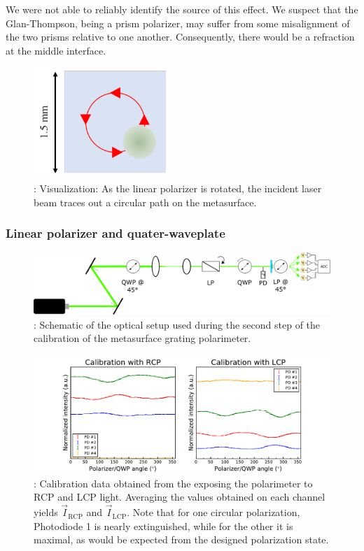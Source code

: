 \documentclass[footinbib,aps,prl,superscriptaddress]{revtex4-1}
\begin{document}
We were not able to reliably identify the source of this effect. We suspect that the Glan-Thompson, being a prism polarizer, may suffer from some misalignment of the two prisms relative to one another. Consequently, there would be a refraction at the middle interface.

\begin{figure}[!htp]
	\centering
	\includegraphics[width=5cm]{orbit.pdf}
	\caption{\label{fig:orbit}: Visualization: As the linear polarizer is rotated, the incident laser beam traces out a circular path on the metasurface.}
\end{figure} 

\subsubsection{Linear polarizer and quater-waveplate}

\begin{figure}[!htp]
	\centering
	\includegraphics[width=\linewidth]{schematic_II.pdf}
	\caption{\label{fig:schematic_II}: Schematic of the optical setup used during the second step of the calibration of the metasurface grating polarimeter.}
\end{figure}

\begin{figure}[!htp]
	\centering
	\includegraphics[width=\linewidth]{qwp_cal.pdf}
	\caption{\label{fig:qwp_cal}: Calibration data obtained from the exposing the polarimeter to RCP and LCP light. Averaging the values obtained on each channel yields $\vec{I}_{\text{RCP}}$ and $\vec{I}_{\text{LCP}}$. Note that for one circular polarization, Photodiode 1 is nearly extinguished, while for the other it is maximal, as would be expected from the designed polarization state.}
\end{figure}
\end{document}
